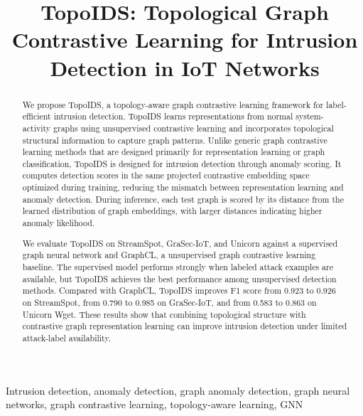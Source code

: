 \documentclass[conference]{IEEEtran}
\newcommand{\sysname}{TopoIDS\xspace}
\begin{document}
\title{\sysname: Topological Graph Contrastive Learning for Intrusion Detection in IoT Networks}

\maketitle

\begin{abstract}
We propose \sysname, a topology-aware graph contrastive learning framework for label-efficient intrusion detection. \sysname learns representations from normal system-activity graphs using unsupervised contrastive learning and incorporates topological structural information to capture graph patterns. Unlike generic graph contrastive learning methods that are designed primarily for representation learning or graph classification, \sysname is designed for intrusion detection through anomaly scoring. It computes detection scores in the same projected contrastive embedding space optimized during training, reducing the mismatch between representation learning and anomaly detection. During inference, each test graph is scored by its distance from the learned distribution of graph embeddings, with larger distances indicating higher anomaly likelihood.

We evaluate \sysname on StreamSpot, GraSec-IoT, and Unicorn against a supervised graph neural network and GraphCL, a unsupervised graph contrastive learning baseline. The supervised model performs strongly when labeled attack examples are available, but \sysname achieves the best performance among unsupervised detection methods. Compared with GraphCL, \sysname improves F1 score from 0.923 to 0.926 on StreamSpot, from 0.790 to 0.985 on GraSec-IoT, and from 0.583 to 0.863 on Unicorn Wget. These results show that combining topological structure with contrastive graph representation learning can improve intrusion detection under limited attack-label availability.
\end{abstract}

\begin{IEEEkeywords}
Intrusion detection, anomaly detection, graph anomaly detection, graph neural networks, graph contrastive learning, topology-aware learning, GNN
\end{IEEEkeywords}
\end{document}

